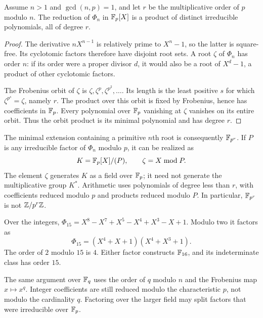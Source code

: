 \begin{prop}
\label{prop-cyclotomy-fp}
Assume $n>1$ and $\gcd(n,p)=1$, and let $r$ be the multiplicative order of
$p$ modulo $n$. The reduction of $\Phi_n$ in $\mathbb{F}_p[X]$ is a product of
distinct irreducible polynomials, all of degree $r$.
\end{prop}
\begin{proof}
The derivative $nX^{n-1}$ is relatively prime to $X^n-1$, so the latter is
square-free. Its cyclotomic factors therefore have disjoint root sets.
A root $\zeta$ of $\Phi_n$ has order $n$: if its order were a proper
divisor $d$, it would also be a root of $X^d-1$, a product of other
cyclotomic factors.

The Frobenius orbit of $\zeta$ is
$\zeta,\zeta^p,\zeta^{p^2},\ldots$. Its length is the least positive $s$
for which $\zeta^{p^s}=\zeta$, namely $r$. The product over this orbit is
fixed by Frobenius, hence has coefficients in $\mathbb{F}_p$. Every polynomial
over $\mathbb{F}_p$ vanishing at $\zeta$ vanishes on its entire orbit. Thus the
orbit product is its minimal polynomial and has degree $r$.
\end{proof}
The minimal extension containing a primitive $n$th root is consequently
$\mathbb{F}_{p^r}$. If $P$ is any irreducible factor of $\Phi_n$ modulo $p$, it can
be realized as
\[
 K=\mathbb{F}_p[X]/(P),\qquad \zeta=X\bmod P.
\]
The element $\zeta$ generates $K$ as a field over $\mathbb{F}_p$; it need not
generate the multiplicative group $K^*$. Arithmetic uses polynomials of
degree less than $r$, with coefficients reduced modulo $p$ and products
reduced modulo $P$. In particular, $\mathbb{F}_{p^r}$ is not $\mathbb{Z}/p^r\mathbb{Z}$.


\begin{exmp}
Over the integers,
$\Phi_{15}=X^8-X^7+X^5-X^4+X^3-X+1$.
Modulo two it factors as
\[
 \Phi_{15}=(X^4+X+1)(X^4+X^3+1).
\]
The order of $2$ modulo $15$ is $4$. Either factor constructs $\mathbb{F}_{16}$,
and its indeterminate class has order $15$.
\end{exmp}
The same argument over $\mathbb{F}_q$ uses the order of $q$ modulo $n$ and the
Frobenius map $x\mapsto x^q$. Integer coefficients are still reduced
modulo the characteristic $p$, not modulo the cardinality $q$.
Factoring over the larger field may split factors that were irreducible
over $\mathbb{F}_p$.


